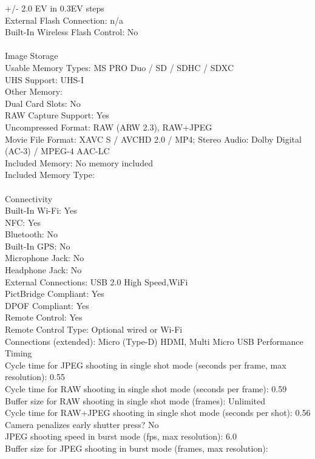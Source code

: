 \documentclass[12pt]{report}
\begin{document}
+/- 2.0 EV in 0.3EV steps 
\\External Flash Connection:
n/a
\\Built-In Wireless Flash Control:
No
\\  \\Image Storage
\\Usable Memory Types:
MS PRO Duo / SD / SDHC / SDXC
\\UHS Support:
UHS-I
\\Other Memory:
\\Dual Card Slots:
No
\\RAW Capture Support:
Yes
\\Uncompressed Format:
RAW (ARW 2.3), RAW+JPEG
\\Movie File Format:
XAVC S / AVCHD 2.0 / MP4; Stereo Audio: Dolby Digital (AC-3) / MPEG-4 AAC-LC
\\Included Memory:
No memory included
\\Included Memory Type:
\\ \\Connectivity
\\Built-In Wi-Fi:
Yes
\\NFC:
Yes
\\Bluetooth:
No
\\Built-In GPS:
No
\\Microphone Jack:
No
\\Headphone Jack:
No
\\External Connections:
USB 2.0 High Speed,WiFi
\\PictBridge Compliant:
Yes
\\DPOF Compliant:
Yes
\\Remote Control:
Yes
\\Remote Control Type:
Optional wired or Wi-Fi
\\Connections (extended):
Micro (Type-D) HDMI, Multi Micro USB
Performance Timing
\\Cycle time for JPEG shooting in single shot mode (seconds per frame, max resolution):
0.55
\\Cycle time for RAW shooting in single shot mode (seconds per frame):
0.59
\\Buffer size for RAW shooting in single shot mode (frames):
Unlimited
\\Cycle time for RAW+JPEG shooting in single shot mode (seconds per shot):
0.56
\\Camera penalizes early shutter press?
No
\\JPEG shooting speed in burst mode (fps, max resolution):
6.0
\\Buffer size for JPEG shooting in burst mode (frames, max resolution):
\end{document}
